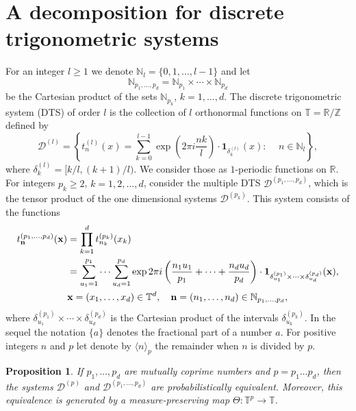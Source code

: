 \documentclass[12pt,reqno,fleqn]{amsart}
\theoremstyle{plain} %
\newtheorem{proposition}{Proposition}[section]
\theoremstyle{remark}
\def\x{\ensuremath{\textbf x}}
\def\n{\ensuremath{\textbf n}}
\def\ZZ{\ensuremath{\mathbb Z}}
\def\ZI{\ensuremath{\mathbf 1}}
\def\ZN{\ensuremath{\mathbb N}}
\def\ZR{\ensuremath{\mathbb R}}
\def\ZD{\ensuremath{\mathscr D}}
\def\ZT{\ensuremath{\mathbb T}}
\theoremstyle{plain}
\numberwithin{equation}{section}
\begin{document}
\section{A decomposition for discrete trigonometric systems}
For an integer $l\ge 1$ we denote $\ZN_l=\{0,1,\ldots ,l-1\}$ and let 
\begin{equation*}
	\ZN_{p_1,\ldots,p_d}= \ZN_{p_1}\times\cdots\times\ZN_{p_d}
\end{equation*}
be the Cartesian product of the sets $\ZN_{p_k}$, $k=1,\ldots, d$. 
The discrete trigonometric system (DTS) of order $l$ is the collection of $l$ orthonormal functions on $\ZT=\ZR/\ZZ$ defined by
\begin{equation}\label{x18}
	\ZD^{(l)}=\left\{t_n^{(l)}(x)=\sum_{k=0}^{l-1}\exp\left(2\pi i \frac{nk}{l}\right)\cdot \ZI_{\delta_k^{(l)}}(x):\,\quad n\in \ZN_l\right\},
\end{equation}
where $\delta_k^{(l)}=[k/l,(k+1)/l)$. We consider those as $1$-periodic functions on $\ZR$.  For integers $p_k\ge 2$, $k=1,2,\ldots,d$, consider the multiple DTS $\ZD^{(p_1,\ldots,p_d)}$, which is the tensor product of the one dimensional systems $\ZD^{(p_k)}$. This system consists of the functions
\begin{align*}
t_{\n}^{(p_1,\ldots,p_d)}(\x)&=\prod_{k=1}^dt_{n_k}^{(p_k)}(x_k)\\
&=\sum_{u_1=1}^{p_1}\cdots \sum_{u_d=1}^{p_d}\exp2\pi i\left( \frac{n_1u_1}{p_1}+\cdots +\frac{n_du_d}{p_d}\right)\cdot \ZI_{\delta_{u_1}^{(p_1)}\times \cdots\times \delta_{u_d}^{(p_d)}}(\x),\\
&\x=(x_1,\ldots,x_d)\in \ZT^d,\quad \n=(n_1,\ldots,n_d)\in \ZN_{p_1,\ldots,p_d},
\end{align*}
where $\delta_{u_1}^{(p_1)}\times \cdots\times \delta_{u_d}^{(p_d)}$ is the Cartesian product of the intervals $\delta_{u_k}^{(p_k)}$. In the sequel the notation $\{a\}$ denotes the fractional part of a number $a$. For positive integers $n$ and $p$ let denote by $\langle n\rangle_p$ the remainder when $n$ is divided by $p$. 
\begin{proposition}\label{P1}
	If $p_1,\ldots, p_d$ are mutually coprime numbers and $p=p_1\ldots p_d$, then the  systems $\ZD^{(p)}$ and $\ZD^{(p_1,\ldots,p_d)}$ are probabilistically equivalent. Moreover, this equivalence is generated by a measure-preserving map $\Theta:\ZT^p\to \ZT$.
\end{proposition}
\end{document}
